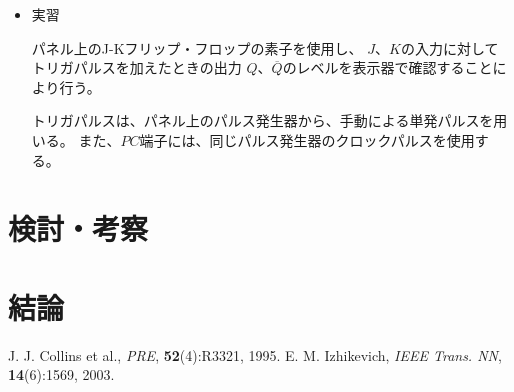 \documentclass[12pt]{jarticle}
\begin{document}
\begin{itemize}
          \clearpage

    \item 実習

          パネル上のJ-Kフリップ・フロップの素子を使用し、
          $J$、$K$の入力に対してトリガパルスを加えたときの出力
          $Q$、$\overline{Q}$のレベルを表示器で確認することにより行う。

          トリガパルスは、パネル上のパルス発生器から、手動による単発パルスを用いる。
          また、$PC$端子には、同じパルス発生器のクロックパルスを使用する。
\end{itemize}

\section{検討・考察}

\section{結論}



\begin{thebibliography}{99}
    \label{sannkoubunnkenn_chapter}
    J. J. Collins et al.,
    {\em PRE}, {\bf 52}(4):R3321, 1995.
     E. M. Izhikevich,
    {\em IEEE Trans. NN}, {\bf 14}(6):1569, 2003.
\end{thebibliography}

\clearpage
\appendix

\end{document}
